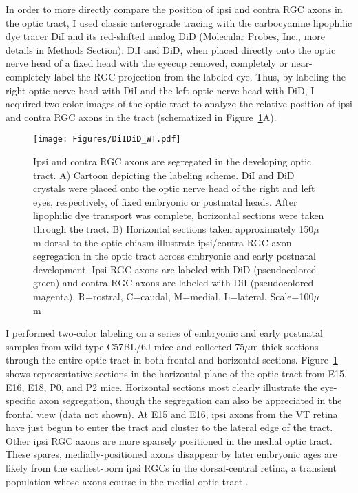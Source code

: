 \label{sec:DiIDiDWT}
In order to more directly compare the position of ipsi and contra RGC axons in the optic tract, I used classic anterograde tracing with the carbocyanine lipophilic dye tracer DiI and its red-shifted analog DiD (Molecular Probes, Inc., more details in Methods Section).
DiI and DiD, when placed directly onto the optic nerve head of a fixed head with the eyecup removed, completely or near-completely label the RGC projection from the labeled eye.
Thus, by labeling the right optic nerve head with DiI and the left optic nerve head with DiD, I acquired two-color images of the optic tract to analyze the relative position of ipsi and contra RGC axons in the tract (schematized in Figure~\ref{Figures/DiIDiDWT}A).

\begin{figure}[hbtp]
    \begin{center}
        \texttt{[image: Figures/DiIDiD\_WT.pdf]}
        \caption[Ipsi and contra RGC axons are segregated in the developing optic tract.]
        {Ipsi and contra RGC axons are segregated in the developing optic tract.
        A) Cartoon depicting the labeling scheme.
        DiI and DiD crystals were placed onto the optic nerve head of the right and left eyes, respectively, of fixed embryonic or postnatal heads.
        After lipophilic dye transport was complete, horizontal sections were taken through the tract.
        B) Horizontal sections taken approximately 150$\mu$m dorsal to the optic chiasm illustrate ipsi/contra RGC axon segregation in the optic tract across embryonic and early postnatal development.
        Ipsi RGC axons are labeled with DiD (pseudocolored green) and contra RGC axons are labeled with DiI (pseudocolored magenta).
        R=rostral, C=caudal, M=medial, L=lateral.
		Scale=100$\mu$m}
        \label{Figures/DiIDiDWT}
    \end{center}
\end{figure}

I performed two-color labeling on a series of embryonic and early postnatal samples from wild-type C57BL/6J mice and collected 75$\mu$m thick sections through the entire optic tract in both frontal and horizontal sections.
Figure~\ref{Figures/DiIDiDWT} shows representative sections in the horizontal plane of the optic tract from E15, E16, E18, P0, and P2 mice.
Horizontal sections most clearly illustrate the eye-specific axon segregation, though the segregation can also be appreciated in the frontal view (data not shown). %
At E15 and E16, ipsi axons from the VT retina have just begun to enter the tract and cluster to the lateral edge of the tract.
Other ipsi RGC axons are more sparsely positioned in the medial optic tract.
These spares, medially-positioned axons disappear by later embryonic ages are likely from the earliest-born ipsi RGCs in the dorsal-central retina, a transient population \cite{drager1985birth} whose axons course in the medial optic tract \cite{soares2015transient}.

